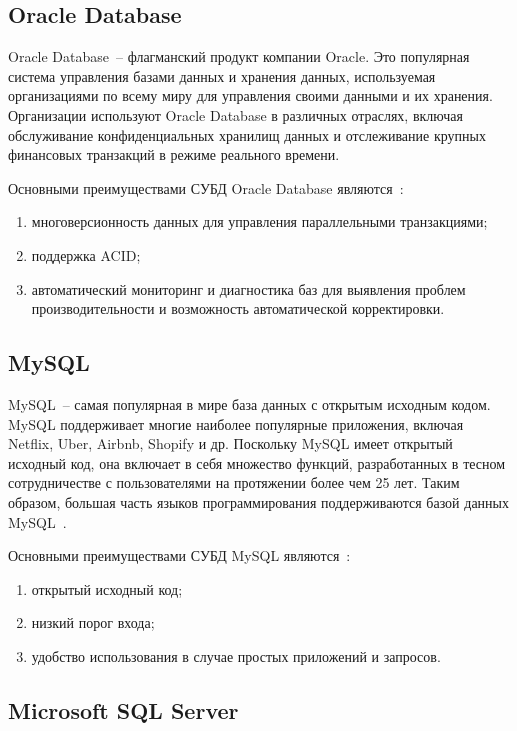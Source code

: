 \subsection{Oracle Database}

Oracle Database~-- флагманский продукт компании Oracle.
Это популярная система управления базами данных и хранения данных, используемая организациями по всему миру для управления своими данными и их хранения.
Организации используют Oracle Database в различных отраслях, включая обслуживание конфиденциальных хранилищ данных и отслеживание крупных финансовых транзакций в режиме реального времени.

Основными преимуществами СУБД Oracle Database являются~\cite{cmpSCDB5}:
\begin{enumerate}
	\item многоверсионность данных для управления параллельными транзакциями;
	\item поддержка ACID;
	\item автоматический мониторинг и диагностика баз для выявления проблем производительности и возможность автоматической корректировки.
\end{enumerate}

\subsection{MySQL}

MySQL~-- самая популярная в мире база данных с открытым исходным кодом.
MySQL поддерживает многие наиболее популярные приложения, включая Netflix, Uber, Airbnb, Shopify и др.
Поскольку MySQL имеет открытый исходный код, она включает в себя множество функций, разработанных в тесном сотрудничестве с пользователями на протяжении более чем 25 лет.
Таким образом, большая часть языков программирования поддерживаются базой данных MySQL~\cite{mysql}.

Основными преимуществами СУБД MySQL являются~\cite{cmpSCDB1, cmpSCDB2, cmpSCDB3}:
\begin{enumerate}
	\item открытый исходный код;
	\item низкий порог входа;
	\item удобство использования в случае простых приложений и запросов.
\end{enumerate}

\subsection{Microsoft SQL Server}

